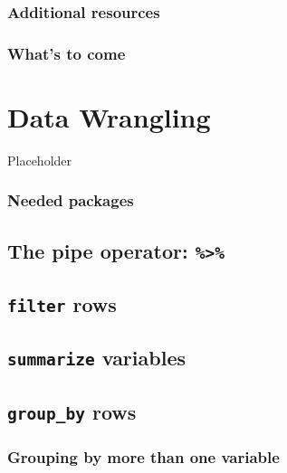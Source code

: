 \documentclass[
  12pt, krantz2,
]{krantz}
\begin{document}
\hypertarget{additional-resources-1}{%
\subsection{Additional resources}\label{additional-resources-1}}

\hypertarget{whats-to-come-3}{%
\subsection{What's to come}\label{whats-to-come-3}}

\hypertarget{wrangling}{%
\chapter{Data Wrangling}\label{wrangling}}

Placeholder

\hypertarget{needed-packages-1}{%
\subsection*{Needed packages}\label{needed-packages-1}}


\hypertarget{piping}{%
\section{\texorpdfstring{The pipe operator: \texttt{\%\textgreater{}\%}}{The pipe operator: \%\textgreater\%}}\label{piping}}

\hypertarget{filter}{%
\section{\texorpdfstring{\texttt{filter} rows}{filter rows}}\label{filter}}

\hypertarget{summarize}{%
\section{\texorpdfstring{\texttt{summarize} variables}{summarize variables}}\label{summarize}}

\hypertarget{groupby}{%
\section{\texorpdfstring{\texttt{group\_by} rows}{group\_by rows}}\label{groupby}}

\hypertarget{grouping-by-more-than-one-variable}{%
\subsection{Grouping by more than one variable}\label{grouping-by-more-than-one-variable}}
\end{document}
